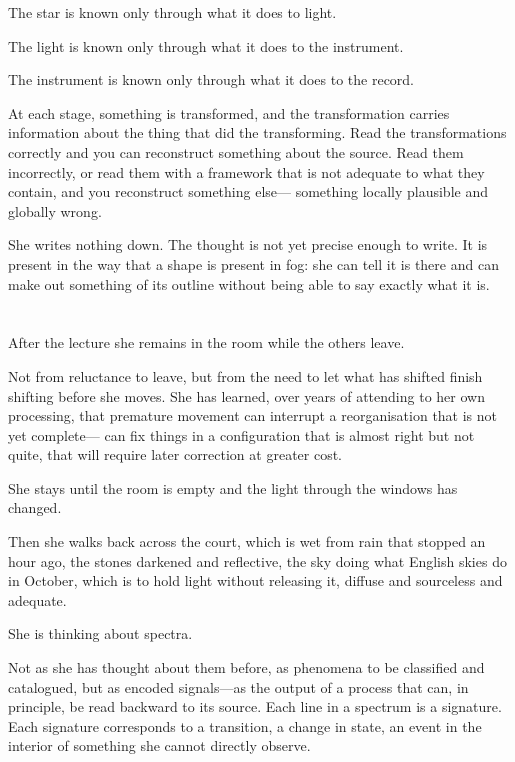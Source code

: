 The star is known only through what it does to light.

The light is known only through what it does to the
instrument.

The instrument is known only through what it does to
the record.

At each stage, something is transformed, and the
transformation carries information about the thing
that did the transforming. Read the transformations
correctly and you can reconstruct something about
the source. Read them incorrectly, or read them
with a framework that is not adequate to what they
contain, and you reconstruct something else---
something locally plausible and globally wrong.

She writes nothing down. The thought is not yet
precise enough to write. It is present in the way
that a shape is present in fog: she can tell it is
there and can make out something of its outline
without being able to say exactly what it is.

\section{}

After the lecture she remains in the room while
the others leave.

Not from reluctance to leave, but from the need
to let what has shifted finish shifting before she
moves. She has learned, over years of attending to
her own processing, that premature movement can
interrupt a reorganisation that is not yet complete---
can fix things in a configuration that is almost
right but not quite, that will require later
correction at greater cost.

She stays until the room is empty and the light
through the windows has changed.

Then she walks back across the court, which is
wet from rain that stopped an hour ago, the
stones darkened and reflective, the sky doing
what English skies do in October, which is to
hold light without releasing it, diffuse and
sourceless and adequate.

She is thinking about spectra.

Not as she has thought about them before, as
phenomena to be classified and catalogued, but
as encoded signals---as the output of a process
that can, in principle, be read backward to its
source. Each line in a spectrum is a signature.
Each signature corresponds to a transition, a
change in state, an event in the interior of
something she cannot directly observe.

